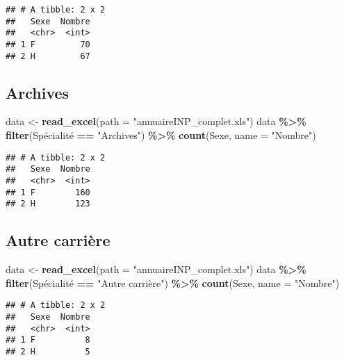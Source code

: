 \documentclass[
]{article}
\newenvironment{Shaded}{\begin{snugshade}}{\end{snugshade}}
\newcommand{\DataTypeTok}[1]{\textcolor[rgb]{0.13,0.29,0.53}{#1}}
\newcommand{\KeywordTok}[1]{\textcolor[rgb]{0.13,0.29,0.53}{\textbf{#1}}}
\newcommand{\NormalTok}[1]{#1}
\newcommand{\OperatorTok}[1]{\textcolor[rgb]{0.81,0.36,0.00}{\textbf{#1}}}
\newcommand{\StringTok}[1]{\textcolor[rgb]{0.31,0.60,0.02}{#1}}
\begin{document}
\begin{verbatim}
## # A tibble: 2 x 2
##   Sexe  Nombre
##   <chr>  <int>
## 1 F         70
## 2 H         67
\end{verbatim}

\hypertarget{archives}{%
\subsection{Archives}\label{archives}}

\begin{Shaded}
\begin{Highlighting}[]
\NormalTok{data \textless{}{-}}\StringTok{ }\KeywordTok{read\_excel}\NormalTok{(}\DataTypeTok{path =} \StringTok{"annuaireINP\_complet.xls"}\NormalTok{)}
\NormalTok{data }\OperatorTok{\%\textgreater{}\%}
\StringTok{  }\KeywordTok{filter}\NormalTok{(Spécialité }\OperatorTok{==}\StringTok{ "Archives"}\NormalTok{) }\OperatorTok{\%\textgreater{}\%}\StringTok{ }
\StringTok{  }\KeywordTok{count}\NormalTok{(Sexe, }\DataTypeTok{name =} \StringTok{"Nombre"}\NormalTok{)}
\end{Highlighting}
\end{Shaded}

\begin{verbatim}
## # A tibble: 2 x 2
##   Sexe  Nombre
##   <chr>  <int>
## 1 F        160
## 2 H        123
\end{verbatim}

\hypertarget{autre-carriuxe8re}{%
\subsection{Autre carrière}\label{autre-carriuxe8re}}

\begin{Shaded}
\begin{Highlighting}[]
\NormalTok{data \textless{}{-}}\StringTok{ }\KeywordTok{read\_excel}\NormalTok{(}\DataTypeTok{path =} \StringTok{"annuaireINP\_complet.xls"}\NormalTok{)}
\NormalTok{data }\OperatorTok{\%\textgreater{}\%}
\StringTok{  }\KeywordTok{filter}\NormalTok{(Spécialité }\OperatorTok{==}\StringTok{ "Autre carrière"}\NormalTok{) }\OperatorTok{\%\textgreater{}\%}\StringTok{ }
\StringTok{  }\KeywordTok{count}\NormalTok{(Sexe, }\DataTypeTok{name =} \StringTok{"Nombre"}\NormalTok{)}
\end{Highlighting}
\end{Shaded}

\begin{verbatim}
## # A tibble: 2 x 2
##   Sexe  Nombre
##   <chr>  <int>
## 1 F          8
## 2 H          5
\end{verbatim}
\end{document}
